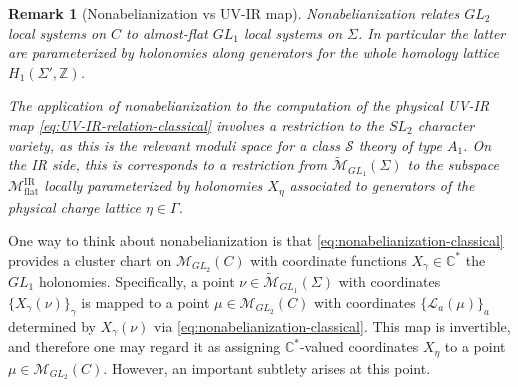 \documentclass{article}
\numberwithin{equation}{section}
\newcommand{\IC}{\mathbb{C}}
\newcommand{\IZ}{\mathbb{Z}}
\newcommand{\CS}{\mathcal{S}}
\renewcommand{\flat}{\mathrm{flat}}
\def\IZ{{\mathbb{Z}}}
\def\IC{{\mathbb{C}}}
\def\CL{\mathcal{L}}
\def\CM{{\mathcal{M}}}
\def\fY{\Gamma}
\newtheorem{remark}{Remark}
\begin{document}
\begin{remark}[Nonabelianization vs UV-IR map]\label{rmk:physical-holonomies}
Nonabelianization relates $GL_2$ local systems on $C$ to almost-flat $GL_1$ local systems on $\Sigma$. 
In particular the latter are parameterized by holonomies along generators for the whole homology lattice $H_1(\Sigma',\IZ)$.

The application of nonabelianization to the computation of the physical UV-IR map \eqref{eq:UV-IR-relation-classical} involves a restriction to the $SL_2$ character variety, as this is the relevant moduli space for a class $\CS$ theory of type $A_1$. 
On the IR side, this is corresponds to a restriction from $ \tilde \CM_{GL_1}(\Sigma)$ to the subspace $\CM_{\flat}^{\mathrm{IR}}$ locally parameterized by holonomies $X_\eta$ associated to generators of the physical charge lattice $\eta\in \fY$.
\end{remark}


One way to think about nonabelianization is that \eqref{eq:nonabelianization-classical} provides a cluster chart on $\CM_{GL_2}(C)$ with coordinate functions $X_\gamma\in \IC^*$ the $GL_1$ holonomies. 
Specifically, a point $\nu \in \tilde \CM_{GL_1}(\Sigma)$ with coordinates $\{X_\gamma(\nu)\}_\gamma$
is mapped to a point  $\mu \in \CM_{GL_2}(C)$ with coordinates $\{\CL_a(\mu)\}_a$ determined by $X_\gamma(\nu)$ via \eqref{eq:nonabelianization-classical}.
This map is invertible, and therefore one may regard it as assigning $\IC^*$-valued coordinates $X_{\eta}$ to a point $\mu\in \CM_{GL_2}(C)$. 
However, an important subtlety arises at this point.
\end{document}
